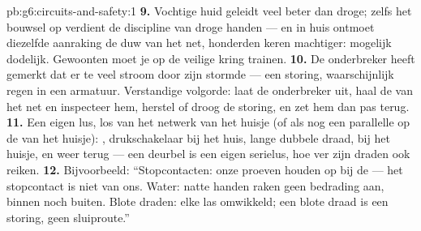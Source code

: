 \begin{solution}{pb:g6:circuits-and-safety:1}
\textbf{9.} Vochtige huid geleidt veel beter dan droge; zelfs het
bouwsel op  verdient de discipline van droge handen --- en in
huis ontmoet diezelfde aanraking de duw van het net, honderden keren
machtiger: mogelijk dodelijk. Gewoonten moet je op de veilige kring
trainen.
\textbf{10.} De onderbreker heeft gemerkt dat er te veel stroom door
zijn  stormde --- een storing, waarschijnlijk regen in een
armatuur. Verstandige volgorde: laat de onderbreker uit, haal de
 van het net en inspecteer hem, herstel of droog de storing, en
zet hem dan pas terug.
\textbf{11.} Een eigen lus, los van het netwerk van het huisje (of
als nog een parallelle  op de  van het huisje):
, drukschakelaar bij het huis, lange dubbele draad,
 bij het huisje, en weer terug --- een deurbel is een eigen
serielus, hoe ver zijn draden ook reiken.
\textbf{12.} Bijvoorbeeld: ``Stopcontacten: onze proeven houden op bij
de  --- het stopcontact is niet van ons. Water: natte handen
raken geen bedrading aan, binnen noch buiten. Blote draden: elke las
omwikkeld; een blote draad is een storing, geen sluiproute.''
\end{solution}
